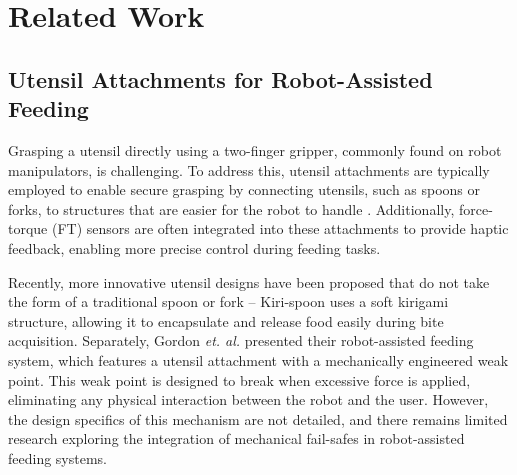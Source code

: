 \section{Related Work}
\subsection{Utensil Attachments for Robot-Assisted Feeding}
Grasping a utensil directly using a two-finger gripper, commonly found on robot manipulators, is challenging. To address this, utensil attachments are typically employed to enable secure grasping by connecting utensils, such as spoons or forks, to structures that are easier for the robot to handle \cite{park2020active, gordon2024adaptable, belkhale2022balancing, shaikewitz2023mouth, jenamani2024feel}. Additionally, force-torque (FT) sensors are often integrated into these attachments to provide haptic feedback, enabling more precise control during feeding tasks. 

Recently, more innovative utensil designs have been proposed that do not take the form of a traditional spoon or fork -- Kiri-spoon \cite{keely2024kiri} uses a soft kirigami structure, allowing it to encapsulate and release food easily during bite acquisition. Separately, Gordon \textit{et. al.} \cite{gordon2024adaptable} presented their robot-assisted feeding system, which features a utensil attachment with a mechanically engineered weak point. This weak point is designed to break when excessive force is applied, eliminating any physical interaction between the robot and the user. However, the design specifics of this mechanism are not detailed, and there remains limited research exploring the integration of mechanical fail-safes in robot-assisted feeding systems.



